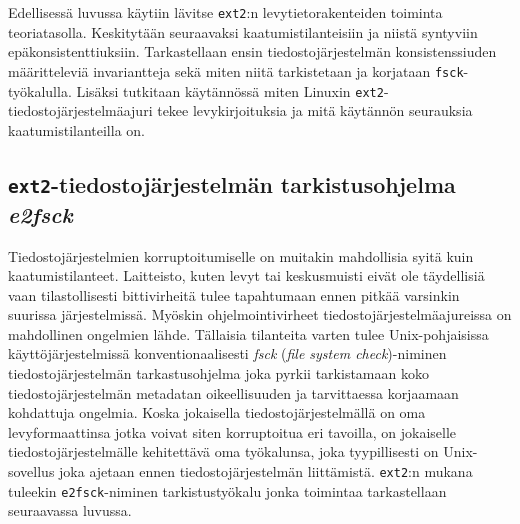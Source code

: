 Edellisessä luvussa käytiin lävitse \texttt{ext2}:n levytietorakenteiden toiminta teoriatasolla.
Keskitytään seuraavaksi kaatumistilanteisiin ja niistä syntyviin epäkonsistenttiuksiin.
Tarkastellaan ensin tiedostojärjestelmän konsistenssiuden määritteleviä invariantteja sekä miten niitä tarkistetaan ja korjataan \texttt{fsck}-työkalulla.
Lisäksi tutkitaan käytännössä miten Linuxin \texttt{ext2}-tiedostojärjestelmäajuri tekee levykirjoituksia ja mitä käytännön seurauksia kaatumistilanteilla on.

\subsection{\texttt{ext2}-tiedostojärjestelmän tarkistusohjelma \emph{e2fsck}}
Tiedostojärjestelmien korruptoitumiselle on muitakin mahdollisia syitä kuin kaatumistilanteet.
Laitteisto, kuten levyt tai keskusmuisti eivät ole täydellisiä vaan tilastollisesti bittivirheitä tulee tapahtumaan ennen pitkää varsinkin suurissa järjestelmissä.
Myöskin ohjelmointivirheet tiedostojärjestelmäajureissa on mahdollinen ongelmien lähde.
Tällaisia tilanteita varten tulee Unix-pohjaisissa käyttöjärjestelmissä konventionaalisesti \emph{fsck} (\emph{file system check})-niminen tiedostojärjestelmän tarkastusohjelma joka pyrkii tarkistamaan koko tiedostojärjestelmän metadatan oikeellisuuden ja tarvittaessa korjaamaan kohdattuja ongelmia.
Koska jokaisella tiedostojärjestelmällä on oma levyformaattinsa jotka voivat siten korruptoitua eri tavoilla,
on jokaiselle tiedostojärjestelmälle kehitettävä oma työkalunsa,
joka tyypillisesti on Unix-sovellus joka ajetaan ennen tiedostojärjestelmän liittämistä.
\texttt{ext2}:n mukana tuleekin \texttt{e2fsck}-niminen tarkistustyökalu jonka toimintaa tarkastellaan seuraavassa luvussa.

